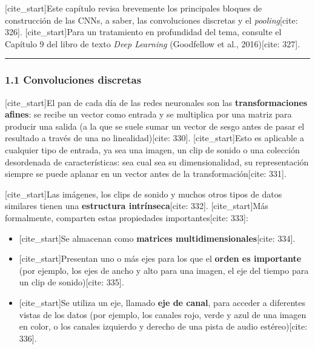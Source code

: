 \documentclass[
  super,
  preprint,
  3p]{elsarticle}
\providecommand{\tightlist}{%
  \setlength{\itemsep}{0pt}\setlength{\parskip}{0pt}}\usepackage{longtable,booktabs,array}
\begin{document}
{[}cite\_start{]}Este capítulo revisa brevemente los principales bloques
de construcción de las CNNs, a saber, las convoluciones discretas y el
\emph{pooling}{[}cite: 326{]}. {[}cite\_start{]}Para un tratamiento en
profundidad del tema, consulte el Capítulo 9 del libro de texto
\emph{Deep Learning} (Goodfellow et al., 2016){[}cite: 327{]}.

\begin{center}\rule{0.5\linewidth}{0.5pt}\end{center}

\subsubsection{1.1 Convoluciones
discretas}\label{convoluciones-discretas}

{[}cite\_start{]}El pan de cada día de las redes neuronales son las
\textbf{transformaciones afines}: se recibe un vector como entrada y se
multiplica por una matriz para producir una salida (a la que se suele
sumar un vector de sesgo antes de pasar el resultado a través de una no
linealidad){[}cite: 330{]}. {[}cite\_start{]}Esto es aplicable a
cualquier tipo de entrada, ya sea una imagen, un clip de sonido o una
colección desordenada de características: sea cual sea su
dimensionalidad, su representación siempre se puede aplanar en un vector
antes de la transformación{[}cite: 331{]}.

{[}cite\_start{]}Las imágenes, los clips de sonido y muchos otros tipos
de datos similares tienen una \textbf{estructura intrínseca}{[}cite:
332{]}. {[}cite\_start{]}Más formalmente, comparten estas propiedades
importantes{[}cite: 333{]}:

\begin{itemize}
\tightlist
\item
  {[}cite\_start{]}Se almacenan como \textbf{matrices
  multidimensionales}{[}cite: 334{]}.
\item
  {[}cite\_start{]}Presentan uno o más ejes para los que el
  \textbf{orden es importante} (por ejemplo, los ejes de ancho y alto
  para una imagen, el eje del tiempo para un clip de sonido){[}cite:
  335{]}.
\item
  {[}cite\_start{]}Se utiliza un eje, llamado \textbf{eje de canal},
  para acceder a diferentes vistas de los datos (por ejemplo, los
  canales rojo, verde y azul de una imagen en color, o los canales
  izquierdo y derecho de una pista de audio estéreo){[}cite: 336{]}.
\end{itemize}
\end{document}
